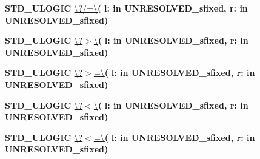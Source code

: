 \begin{DoxyCompactItemize}
\item 
{\bfseries {\bfseries \textcolor{comment}{S\+T\+D\+\_\+\+U\+L\+O\+G\+I\+C}\textcolor{vhdlchar}{ }}} \hyperlink{classfixed__pkg_a6c6e2cca732277bb9db1679431f7a7ee}{\textbackslash{}?/=\textbackslash{}}{\bfseries  ( }{\bfseries \textcolor{vhdlchar}{l\+: }\textcolor{stringliteral}{in }\textcolor{vhdlchar}{U\+N\+R\+E\+S\+O\+L\+V\+E\+D\+\_\+sfixed}}{\bfseries  , \textcolor{vhdlchar}{r\+: }\textcolor{stringliteral}{in }\textcolor{vhdlchar}{U\+N\+R\+E\+S\+O\+L\+V\+E\+D\+\_\+sfixed}}{\bfseries  )} 
\item 
{\bfseries {\bfseries \textcolor{comment}{S\+T\+D\+\_\+\+U\+L\+O\+G\+I\+C}\textcolor{vhdlchar}{ }}} \hyperlink{classfixed__pkg_a255dae6821ca0cde38c9cb50f0669430}{\textbackslash{}?$>$\textbackslash{}}{\bfseries  ( }{\bfseries \textcolor{vhdlchar}{l\+: }\textcolor{stringliteral}{in }\textcolor{vhdlchar}{U\+N\+R\+E\+S\+O\+L\+V\+E\+D\+\_\+sfixed}}{\bfseries  , \textcolor{vhdlchar}{r\+: }\textcolor{stringliteral}{in }\textcolor{vhdlchar}{U\+N\+R\+E\+S\+O\+L\+V\+E\+D\+\_\+sfixed}}{\bfseries  )} 
\item 
{\bfseries {\bfseries \textcolor{comment}{S\+T\+D\+\_\+\+U\+L\+O\+G\+I\+C}\textcolor{vhdlchar}{ }}} \hyperlink{classfixed__pkg_aec60ec8548aac7b2ab232a0736633a3f}{\textbackslash{}?$>$=\textbackslash{}}{\bfseries  ( }{\bfseries \textcolor{vhdlchar}{l\+: }\textcolor{stringliteral}{in }\textcolor{vhdlchar}{U\+N\+R\+E\+S\+O\+L\+V\+E\+D\+\_\+sfixed}}{\bfseries  , \textcolor{vhdlchar}{r\+: }\textcolor{stringliteral}{in }\textcolor{vhdlchar}{U\+N\+R\+E\+S\+O\+L\+V\+E\+D\+\_\+sfixed}}{\bfseries  )} 
\item 
{\bfseries {\bfseries \textcolor{comment}{S\+T\+D\+\_\+\+U\+L\+O\+G\+I\+C}\textcolor{vhdlchar}{ }}} \hyperlink{classfixed__pkg_a7cd0b020d4367e68cc8e5898e519f0b0}{\textbackslash{}?$<$\textbackslash{}}{\bfseries  ( }{\bfseries \textcolor{vhdlchar}{l\+: }\textcolor{stringliteral}{in }\textcolor{vhdlchar}{U\+N\+R\+E\+S\+O\+L\+V\+E\+D\+\_\+sfixed}}{\bfseries  , \textcolor{vhdlchar}{r\+: }\textcolor{stringliteral}{in }\textcolor{vhdlchar}{U\+N\+R\+E\+S\+O\+L\+V\+E\+D\+\_\+sfixed}}{\bfseries  )} 
\item 
{\bfseries {\bfseries \textcolor{comment}{S\+T\+D\+\_\+\+U\+L\+O\+G\+I\+C}\textcolor{vhdlchar}{ }}} \hyperlink{classfixed__pkg_a52cea50a28a3ac135e780eb2b2f7c474}{\textbackslash{}?$<$=\textbackslash{}}{\bfseries  ( }{\bfseries \textcolor{vhdlchar}{l\+: }\textcolor{stringliteral}{in }\textcolor{vhdlchar}{U\+N\+R\+E\+S\+O\+L\+V\+E\+D\+\_\+sfixed}}{\bfseries  , \textcolor{vhdlchar}{r\+: }\textcolor{stringliteral}{in }\textcolor{vhdlchar}{U\+N\+R\+E\+S\+O\+L\+V\+E\+D\+\_\+sfixed}}{\bfseries  )} 

\end{DoxyCompactItemize}
